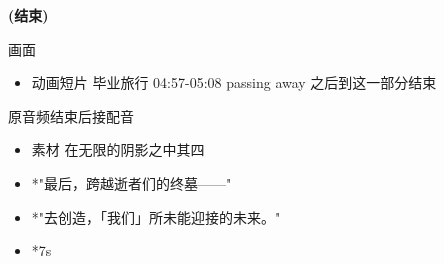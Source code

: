 \documentclass[a4paper]{article}
\begin{document}
\textbf{(结束)}

画面

\begin{itemize}
    \item 动画短片 毕业旅行 04:57-05:08 passing away 之后到这一部分结束
\end{itemize}

原音频结束后接配音

\begin{itemize}
    \item 素材 在无限的阴影之中其四
    \item *"最后，跨越逝者们的终墓——"
    \item *"去创造，「我们」所未能迎接的未来。"
    \item *7s
\end{itemize}

\end{document}
